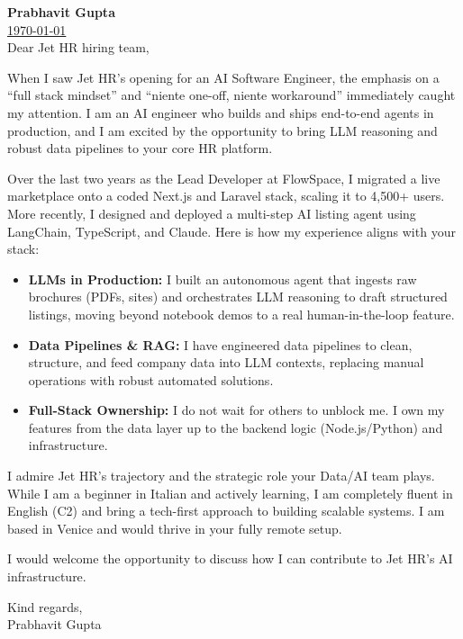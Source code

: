 \documentclass[11pt,a4paper]{article}
\begin{document}
{\Large \textbf{Prabhavit Gupta}} \\[1ex]
  \href{mailto:prabhavitg@gmail.com \\[2ex]
\noindent\rule{\textwidth}{0.4pt} \\[2ex]{prabhavitg@gmail.com} | +39 351 610 7807 |  \urlstyle{same}\href{https://www.linkedin.com/in/prabhavit/}{LinkedIn}
}


\today \\[2ex]
Dear Jet HR hiring team,


When I saw Jet HR's opening for an AI Software Engineer, the emphasis on a ``full stack mindset'' and ``niente one-off, niente workaround'' immediately caught my attention. I am an AI engineer who builds and ships end-to-end agents in production, and I am excited by the opportunity to bring LLM reasoning and robust data pipelines to your core HR platform.


Over the last two years as the Lead Developer at FlowSpace, I migrated a live marketplace onto a coded Next.js and Laravel stack, scaling it to 4,500+ users. More recently, I designed and deployed a multi-step AI listing agent using LangChain, TypeScript, and Claude. Here is how my experience aligns with your stack:


\begin{itemize}
    \item \textbf{LLMs in Production:} I built an autonomous agent that ingests raw brochures (PDFs, sites) and orchestrates LLM reasoning to draft structured listings, moving beyond notebook demos to a real human-in-the-loop feature.
    \item \textbf{Data Pipelines \& RAG:} I have engineered data pipelines to clean, structure, and feed company data into LLM contexts, replacing manual operations with robust automated solutions.
    \item \textbf{Full-Stack Ownership:} I do not wait for others to unblock me. I own my features from the data layer up to the backend logic (Node.js/Python) and infrastructure.
\end{itemize}
\vspace{6pt}

I admire Jet HR's trajectory and the strategic role your Data/AI team plays. While I am a beginner in Italian and actively learning, I am completely fluent in English (C2) and bring a tech-first approach to building scalable systems. I am based in Venice and would thrive in your fully remote setup.


I would welcome the opportunity to discuss how I can contribute to Jet HR's AI infrastructure.


\begin{flushright}
Kind regards, \\[3ex]

Prabhavit Gupta
\end{flushright}
\end{document}
